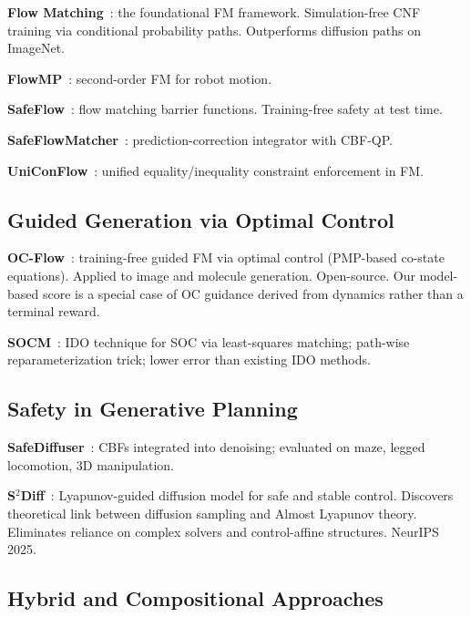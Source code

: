 \documentclass[letterpaper, 10pt, conference]{ieeeconf}
\begin{document}
\textbf{Flow Matching}~\cite{lipman2023flow}: the foundational FM framework.
Simulation-free CNF training via conditional probability paths. Outperforms
diffusion paths on ImageNet.

\textbf{FlowMP}~\cite{flowmp}: second-order FM for robot motion.

\textbf{SafeFlow}~\cite{safeflow}: flow matching barrier functions.
Training-free safety at test time.

\textbf{SafeFlowMatcher}~\cite{yang2025safeflowmatcher}: prediction-correction
integrator with CBF-QP.

\textbf{UniConFlow}~\cite{yang2025uniconflow}: unified equality/inequality
constraint enforcement in FM.

\subsection{Guided Generation via Optimal Control}

\textbf{OC-Flow}~\cite{ocflow}: training-free guided FM via optimal
control (PMP-based co-state equations). Applied to image and molecule generation.
Open-source. Our model-based score is a special case of OC guidance derived
from dynamics rather than a terminal reward.

\textbf{SOCM}~\cite{domingoenrich2024socm}: IDO technique for SOC via
least-squares matching; path-wise reparameterization trick; lower error than
existing IDO methods.

\subsection{Safety in Generative Planning}

\textbf{SafeDiffuser}~\cite{xiao2025safediffuser}: CBFs integrated into
denoising; evaluated on maze, legged locomotion, 3D manipulation.

\textbf{S$^2$Diff}~\cite{s2diff}: Lyapunov-guided diffusion model for
safe and stable control. Discovers theoretical link between diffusion sampling
and Almost Lyapunov theory. Eliminates reliance on complex solvers and
control-affine structures. NeurIPS 2025.

\subsection{Hybrid and Compositional Approaches}
\end{document}
